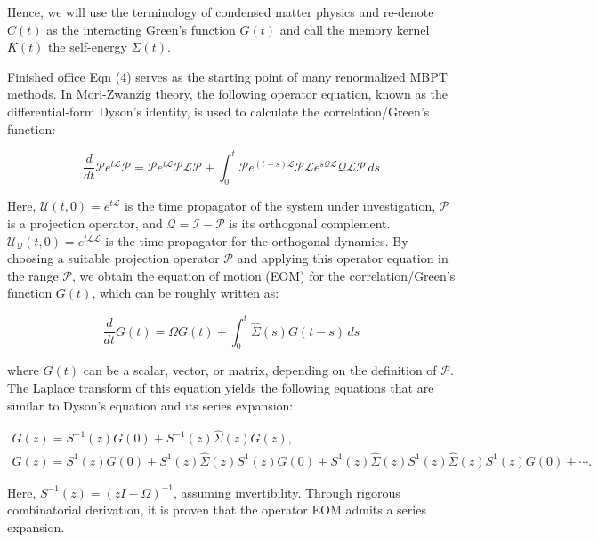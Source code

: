 \documentclass[12pt]{article}
\begin{document}
Hence, we will use the terminology of condensed matter physics and re-denote \( C(t) \) as the interacting Green’s function \( G(t) \) and call the memory kernel \( K(t) \) the self-energy \( \Sigma(t) \).

Finished office
Eqn (4) serves as the starting point of many renormalized MBPT methods. In Mori-Zwanzig theory, the following operator equation, known as the differential-form Dyson's identity, is used to calculate the correlation/Green's function:

\begin{equation}
\frac{d}{d t} \mathcal{P} e^{t \mathcal{L}} \mathcal{P}=\mathcal{P} e^{t \mathcal{L}} \mathcal{P} \mathcal{L} \mathcal{P}+\int_0^t \mathcal{P} e^{(t-s) \mathcal{L}} \mathcal{P} \mathcal{L} e^{s \mathcal{Q} \mathcal{L}} \mathcal{Q L} \mathcal{P} \, ds
\end{equation}

Here, \( \mathcal{U}(t, 0)=e^{t \mathcal{L}} \) is the time propagator of the system under investigation, \( \mathcal{P} \) is a projection operator, and \( \mathcal{Q}=\mathcal{I}-\mathcal{P} \) is its orthogonal complement. \( \mathcal{U}_{\mathcal{Q}}(t, 0)=e^{t \mathcal{L} \mathcal{L}} \) is the time propagator for the orthogonal dynamics. By choosing a suitable projection operator \( \mathcal{P} \) and applying this operator equation in the range \( \mathcal{P} \), we obtain the equation of motion (EOM) for the correlation/Green's function \( G(t) \), which can be roughly written as:

\begin{equation}
\frac{d}{d t} G(t)=\Omega G(t)+\int_0^t \hat{\Sigma}(s) G(t-s) \, ds
\end{equation}

where \( G(t) \) can be a scalar, vector, or matrix, depending on the definition of \( \mathcal{P} \). The Laplace transform of this equation yields the following equations that are similar to Dyson's equation and its series expansion:

\begin{gather}
G(z)=S^{-1}(z) G(0)+S^{-1}(z) \hat{\Sigma}(z) G(z), \\
G(z)=S^1(z) G(0)+S^1(z) \hat{\Sigma}(z) S^1(z) G(0)+S^1(z) \hat{\Sigma}(z) S^1(z) \hat{\Sigma}(z) S^1(z) G(0)+\cdots.
\end{gather}

Here, \( S^{-1}(z)=(z I-\Omega)^{-1} \), assuming invertibility. Through rigorous combinatorial derivation, it is proven that the operator EOM admits a series expansion.
\end{document}
